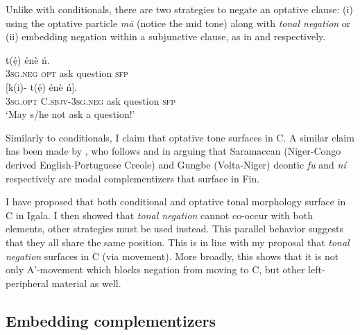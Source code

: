 \documentclass[output=paper,colorlinks,citecolor=brown,
]{langscibook}
\begin{document}
Unlike with conditionals, there are two strategies to negate an optative clause: (i) using the optative particle \textit{m\={a}} (notice the mid tone) along with \textit{tonal negation} or (ii) embedding negation within a subjunctive clause, as in  and  respectively.

\ea
\begin{xlist}

\ex \label{ex:chaperon:optprt}
\gll {} 		 		t(\'{ẹ}) 	énè	\'{n}.\\
    \textsc{3sg.neg} \textsc{opt} ask	question \textsc{sfp}\\

\ex \label{ex:chaperon:optsbjv}
\gll {} 		[k(i)- 		t(\'{ẹ}) 	énè	\'{n}].\\
    \textsc{3sg.opt} C.\textsc{sbjv}-\textsc{3sg.neg} ask	question \textsc{sfp}\\
    \glt `May s/he not ask a question!'

\end{xlist}
\z

Similarly to conditionals, I claim that optative tone surfaces in C. A similar claim has been made by \citet{aboh2006complementation}, who follows \citet{damonte2002complementizer} and \citet{aboh2004morphosyntax} in arguing that Saramaccan (Niger-Congo derived English-Portuguese Creole) and Gungbe (Volta-Niger) deontic \textit{fu} and \textit{n\'{i}} respectively are modal complementizers that surface in Fin\xhead{}. %

I have proposed that both conditional and optative tonal morphology surface in C in Igala. I then showed that \textit{tonal negation} cannot co-occur with both elements, other strategies must be used instead. This parallel behavior suggests that they all share the same position. This is in line with my proposal that \textit{tonal negation} surfaces in C (via movement). More broadly, this shows that it is not only A'-movement which blocks negation from moving to C, but other left-peripheral material as well.


\subsection{Embedding complementizers}
\end{document}
